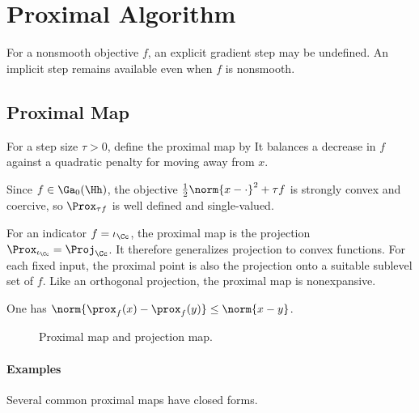 \section{Proximal Algorithm}

For a nonsmooth objective $f$, an explicit gradient step may be undefined. An implicit step remains available even when $f$ is nonsmooth.


                                                
\subsection{Proximal Map}

For a step size $\tau>0$, define the proximal map by
It balances a decrease in $f$ against a quadratic penalty for moving away from $x$.
 
Since $f\in\Ga_0(\Hh)$, the objective $\frac12\norm{x-\cdot}^2+\tau f$ is strongly convex and coercive, so $\Prox_{\tau f}$ is well defined and single-valued.

For an indicator $f=\iota_\Cc$, the proximal map is the projection $\Prox_{\iota_\Cc}=\Proj_{\Cc}$. It therefore generalizes projection to convex functions. For each fixed input, the proximal point is also the projection onto a suitable sublevel set of $f$. Like an orthogonal projection, the proximal map is nonexpansive.

\begin{prop}
	One has $\norm{ \prox_{f}(x)-\prox_{f}(y) } \leq \norm{x-y}$.
\end{prop}



\begin{figure}[tbp]
\centering
{}
\caption{Proximal map and projection map.}
\label{fig-prox-proj}
\end{figure}


   
\paragraph{Examples}

Several common proximal maps have closed forms.

